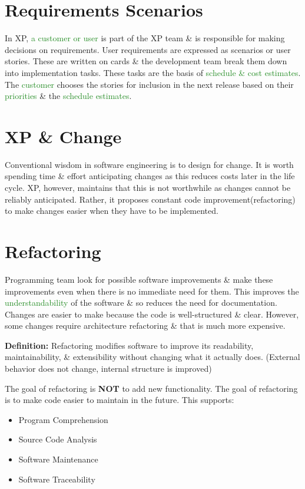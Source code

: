 \documentclass{report}
\newcommand{\textg}[1]{\textcolor{ForestGreen}{#1}}
\begin{document}
\section{Requirements Scenarios}
\noindent In XP, \textg{a customer or user} is part of the XP team \& is responsible for making decisions on requirements. User requirements are expressed as scenarios or user stories. These are written on cards \& the development team break them down into implementation tasks. These tasks are the basis of \textg{schedule \& cost estimates}. The \textg{customer} chooses the stories for inclusion in the next release based on their \textg{priorities} \& the \textg{schedule estimates}.


\section{XP \& Change}
\noindent Conventional wisdom in software engineering is to design for change. It is worth spending time \& effort anticipating changes as this reduces costs later in the life cycle. XP, however, maintains that this is not worthwhile as changes cannot be reliably anticipated. Rather, it proposes constant code improvement(refactoring) to make changes easier when they have to be implemented.

\section{Refactoring}
\noindent Programming team look for possible software improvements \& make these improvements even when there is no immediate need for them. This improves the \textg{understandability} of the software \& so reduces the need for documentation. Changes are easier to make because the code is well-structured \& clear. However, some changes require architecture refactoring \& that is much more expensive.\newline

\noindent \textbf{Definition:} Refactoring modifies software to improve its readability, maintainability, \& extensibility without changing what it actually does. (External behavior does not change, internal structure is improved)\newline

\noindent The goal of refactoring is \textbf{NOT} to add new functionality. The goal of refactoring is to make code easier to maintain in the future. This supports:
\begin{itemize}
  \item Program Comprehension
  \item Source Code Analysis
  \item Software Maintenance
  \item Software Traceability
\end{itemize}
\end{document}
